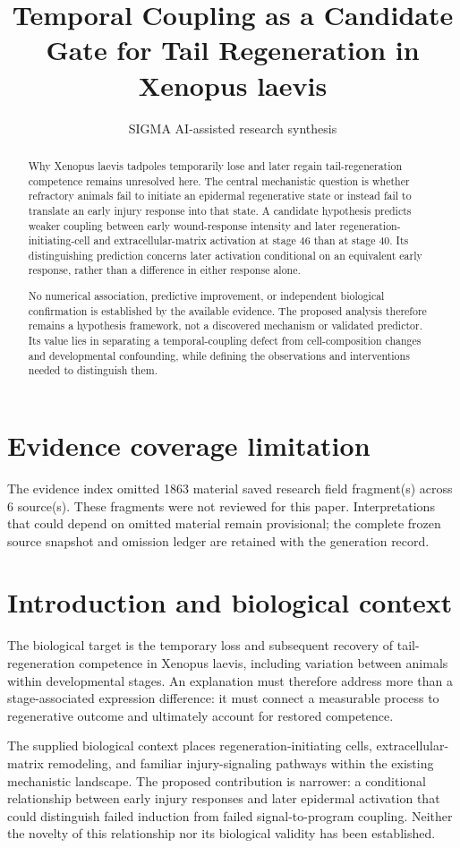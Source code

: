 \documentclass[11pt]{article}
\title{Temporal Coupling as a Candidate Gate for Tail Regeneration in Xenopus laevis}
\date{}
\author{SIGMA AI-assisted research synthesis}
\begin{document}
\maketitle

\begin{abstract}
Why Xenopus laevis tadpoles temporarily lose and later regain tail-regeneration competence remains unresolved here. The central mechanistic question is whether refractory animals fail to initiate an epidermal regenerative state or instead fail to translate an early injury response into that state. A candidate hypothesis predicts weaker coupling between early wound-response intensity and later regeneration-initiating-cell and extracellular-matrix activation at stage 46 than at stage 40. Its distinguishing prediction concerns later activation conditional on an equivalent early response, rather than a difference in either response alone.

No numerical association, predictive improvement, or independent biological confirmation is established by the available evidence. The proposed analysis therefore remains a hypothesis framework, not a discovered mechanism or validated predictor. Its value lies in separating a temporal-coupling defect from cell-composition changes and developmental confounding, while defining the observations and interventions needed to distinguish them.
\end{abstract}
\section*{Evidence coverage limitation}
The evidence index omitted 1863 material saved research field fragment(s) across 6 source(s). These fragments were not reviewed for this paper. Interpretations that could depend on omitted material remain provisional; the complete frozen source snapshot and omission ledger are retained with the generation record.
\section{Introduction and biological context}
The biological target is the temporary loss and subsequent recovery of tail-regeneration competence in Xenopus laevis, including variation between animals within developmental stages. An explanation must therefore address more than a stage-associated expression difference: it must connect a measurable process to regenerative outcome and ultimately account for restored competence.

The supplied biological context places regeneration-initiating cells, extracellular-matrix remodeling, and familiar injury-signaling pathways within the existing mechanistic landscape. The proposed contribution is narrower: a conditional relationship between early injury responses and later epidermal activation that could distinguish failed induction from failed signal-to-program coupling. Neither the novelty of this relationship nor its biological validity has been established.
\end{document}
